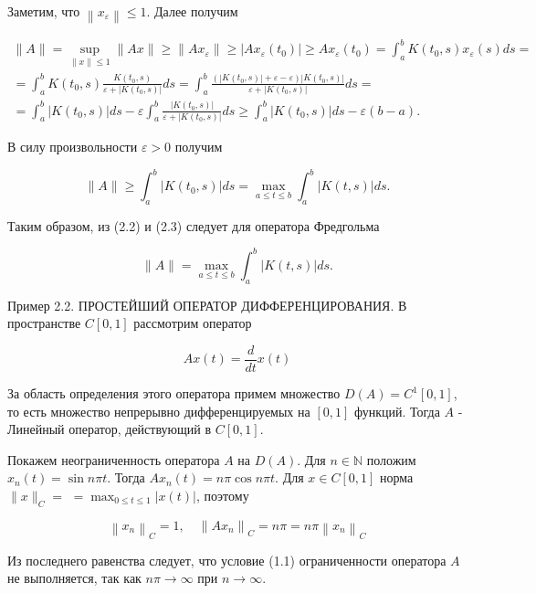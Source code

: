 Заметим, что $\left\|x_{\varepsilon}\right\| \leq 1$. Далее получим

$$
	\begin{gathered}
		\|A\|=\sup _{\|x\| \leq 1}\|A x\| \geq\left\|A x_{\varepsilon}\right\| \geq\left|A x_{\varepsilon}\left(t_{0}\right)\right| \geq A x_{\varepsilon}\left(t_{0}\right)=\int_{a}^{b} K\left(t_{0}, s\right) x_{\varepsilon}(s) d s= \\
		=\int_{a}^{b} K\left(t_{0}, s\right) \frac{K\left(t_{0}, s\right)}{\varepsilon+\left|K\left(t_{0}, s\right)\right|} d s=\int_{a}^{b} \frac{\left(\left|K\left(t_{0}, s\right)\right|+\varepsilon-\varepsilon\right)\left|K\left(t_{0}, s\right)\right|}{\varepsilon+\left|K\left(t_{0}, s\right)\right|} d s= \\
		=\int_{a}^{b}\left|K\left(t_{0}, s\right)\right| d s-\varepsilon \int_{a}^{b} \frac{\left|K\left(t_{0}, s\right)\right|}{\varepsilon+\left|K\left(t_{0}, s\right)\right|} d s \geq \int_{a}^{b}\left|K\left(t_{0}, s\right)\right| d s-\varepsilon(b-a) .
	\end{gathered}
$$

В силу произвольности $\varepsilon>0$ получим

$$
	\|A\| \geq \int_{a}^{b}\left|K\left(t_{0}, s\right)\right| d s=\max _{a \leq t \leq b} \int_{a}^{b}|K(t, s)| d s .
$$

Таким образом, из (2.2) и (2.3) следует для оператора Фредгольма

$$
	\|A\|=\max _{a \leq t \leq b} \int_{a}^{b}|K(t, s)| d s .
$$

Пример 2.2. ПРОСТЕЙШИЙ ОПЕРАТОР ДИФФЕРЕНЦИРОВАНИЯ. В пространстве $C[0,1]$ рассмотрим оператор

$$
	A x(t)=\frac{d}{d t} x(t)
$$

За область определения этого оператора примем множество $D(A)=C^{1}[0,1]$, то есть множество непрерывно дифференцируемых на $[0,1]$ функций. Тогда $A$ - Линейный оператор, действующий в $C[0,1]$.

Покажем неограниченность оператора $A$ на $D(A)$. Для $n \in \mathbb{N}$ положим $x_{n}(t)=\sin n \pi t$. Тогда $A x_{n}(t)=n \pi \cos n \pi t$. Для $x \in C[0,1]$ норма $\|x\|_{C}=$ $=\max _{0 \leq t \leq 1}|x(t)|$, поэтому

$$
	\left\|x_{n}\right\|_{C}=1, \quad\left\|A x_{n}\right\|_{C}=n \pi=n \pi\left\|x_{n}\right\|_{C}
$$

Из последнего равенства следует, что условие (1.1) ограниченности оператора $A$ не выполняется, так как $n \pi \rightarrow \infty$ при $n \rightarrow \infty$.

